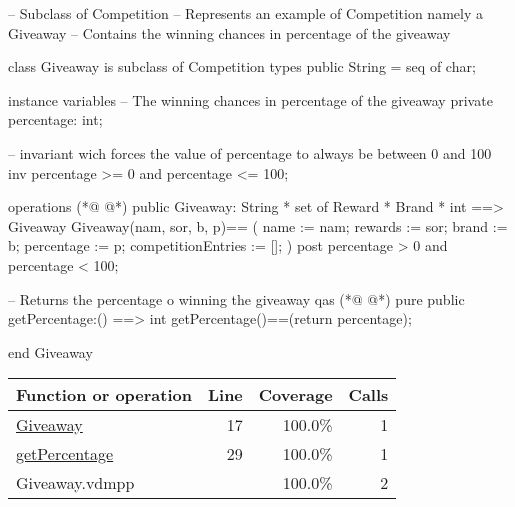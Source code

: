 \begin{vdmpp}[breaklines=true]
-- Subclass of Competition
-- Represents an example of Competition namely a Giveaway
-- Contains the winning chances in percentage of the giveaway

class Giveaway is subclass of Competition
 types
    public String = seq of char;
        
    instance variables
    -- The winning chances in percentage of the giveaway
     private percentage: int;
     
    -- invariant wich forces the value of percentage to always be between 0 and 100
  inv percentage >= 0 and percentage <= 100;
    
  operations 
(*@
\label{Giveaway:17}
@*)
      public Giveaway: String * set of Reward * Brand * int ==> Giveaway
     Giveaway(nam, sor, b, p)==
     (
     name := nam;
     rewards := sor;
     brand := b;
     percentage := p;
     competitionEntries := [];
     )
     post percentage > 0 and percentage < 100;
      
      -- Returns the percentage o winning the giveaway qas      
(*@
\label{getPercentage:29}
@*)
     pure public getPercentage:() ==> int
     getPercentage()==(return percentage);
     
end Giveaway
\end{vdmpp}
\bigskip
\begin{longtable}{|l|r|r|r|}
\hline
Function or operation & Line & Coverage & Calls \\
\hline
\hline
\hyperref[Giveaway:17]{Giveaway} & 17&100.0\% & 1 \\
\hline
\hyperref[getPercentage:29]{getPercentage} & 29&100.0\% & 1 \\
\hline
\hline
Giveaway.vdmpp & & 100.0\% & 2 \\
\hline
\end{longtable}

